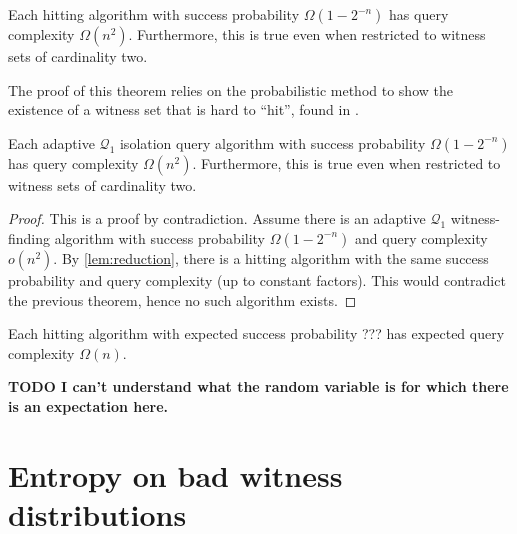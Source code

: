 \documentclass{article}
\newcommand{\todo}[1]{\textbf{TODO #1}}
\newcommand{\mc}{\mathcal}
\begin{document}
\begin{theorem}
  Each hitting algorithm with success probability $\Omega(1 - 2^{-n})$ has query complexity $\Omega(n^2)$.
  Furthermore, this is true even when restricted to witness sets of cardinality two.
\end{theorem}

The proof of this theorem relies on the probabilistic method to show the existence of a witness set that is hard to ``hit'', found in \autocite{ablp91}.

\begin{corollary}\label{cor:isolationalg}
  Each adaptive $\mc{Q}_1$ isolation query algorithm with success probability $\Omega(1 - 2^{-n})$ has query complexity $\Omega(n^2)$.
  Furthermore, this is true even when restricted to witness sets of cardinality two.
\end{corollary}
\begin{proof}
  This is a proof by contradiction.
  Assume there is an adaptive $\mc{Q}_1$ witness-finding algorithm with success probability $\Omega(1 - 2^{-n})$ and query complexity $o(n^2)$.
  By \autoref{lem:reduction}, there is a hitting algorithm with the same success probability and query complexity (up to constant factors).
  This would contradict the previous theorem, hence no such algorithm exists.
\end{proof}


\begin{theorem}
  Each hitting algorithm with expected success probability ??? has expected query complexity $\Omega(n)$.
\end{theorem}

\todo{I can't understand what the random variable is for which there is an expectation here.}

\section{Entropy on bad witness distributions}
\end{document}
